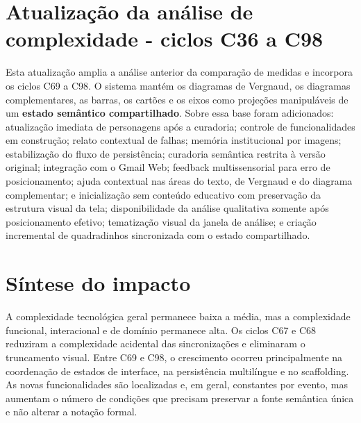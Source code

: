 \documentclass[12pt,a4paper]{article}
\begin{document}
\section*{Atualização da análise de complexidade - ciclos C36 a C98}

Esta atualização amplia a análise anterior da comparação de medidas e incorpora os ciclos C69 a C98. O sistema mantém os diagramas de Vergnaud, os diagramas complementares, as barras, os cartões e os eixos como projeções manipuláveis de um \textbf{estado semântico compartilhado}. Sobre essa base foram adicionados: atualização imediata de personagens após a curadoria; controle de funcionalidades em construção; relato contextual de falhas; memória institucional por imagens; estabilização do fluxo de persistência; curadoria semântica restrita à versão original; integração com o Gmail Web; feedback multissensorial para erro de posicionamento; ajuda contextual nas áreas do texto, de Vergnaud e do diagrama complementar; e inicialização sem conteúdo educativo com preservação da estrutura visual da tela; disponibilidade da análise qualitativa somente após posicionamento efetivo; tematização visual da janela de análise; e criação incremental de quadradinhos sincronizada com o estado compartilhado.

\section{Síntese do impacto}

A complexidade tecnológica geral permanece baixa a média, mas a complexidade funcional, interacional e de domínio permanece alta. Os ciclos C67 e C68 reduziram a complexidade acidental das sincronizações e eliminaram o truncamento visual. Entre C69 e C98, o crescimento ocorreu principalmente na coordenação de estados de interface, na persistência multilíngue e no scaffolding. As novas funcionalidades são localizadas e, em geral, constantes por evento, mas aumentam o número de condições que precisam preservar a fonte semântica única e não alterar a notação formal.
\end{document}
